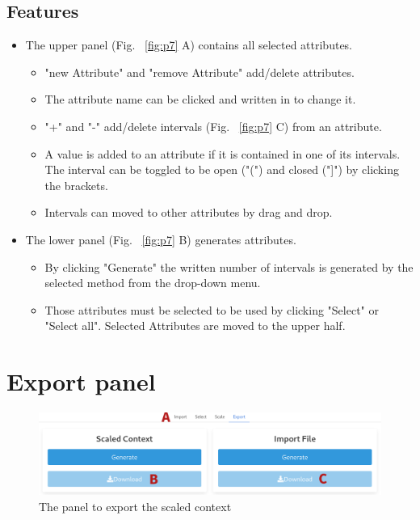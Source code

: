 \documentclass[]{report}
\begin{document}
\subsection{Features}
\begin{itemize}
    \item The upper panel (Fig. ~\ref{fig:p7} A) contains all selected attributes.
    \begin{itemize}
        \item "new Attribute" and "remove Attribute" add/delete attributes. 
        \item The attribute name can be clicked and written in to change it.
        \item "+" and "-" add/delete intervals (Fig. ~\ref{fig:p7} C) from an attribute.
        \item A value is added to an attribute if it is contained in one of its intervals. The interval can be toggled to be open ("(") and closed ("]") by clicking the brackets.
        \item Intervals can moved to other attributes by drag and drop.
    \end{itemize}
    \item The lower panel (Fig. ~\ref{fig:p7} B) generates attributes.
    \begin{itemize}
        \item By clicking "Generate" the written number of intervals is generated by the selected method from the drop-down menu.
        \item Those attributes must be selected to be used by clicking "Select" or "Select all". Selected Attributes are moved to the upper half.
    \end{itemize}
\end{itemize}

\section{Export panel}
\begin{figure}[H]
	\includegraphics[width=\linewidth]{final_presentation/images/export.png}
	\caption{The panel to export the scaled context}
	\label{fig:p8}
\end{figure}
\end{document}
